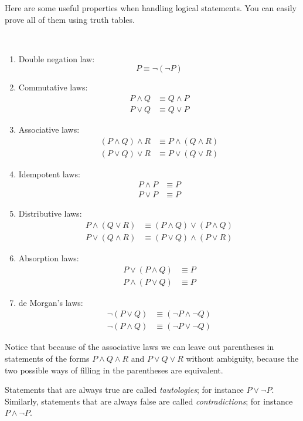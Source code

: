 Here are some useful properties when handling logical statements. You can easily prove all of them using truth tables.
\begin{lemma} \
\begin{enumerate}[label=(\roman*)]
\item Double negation law:
\[P\equiv\lnot(\lnot P)\]
\item Commutative laws:
\begin{align*}
P\land Q&\equiv Q\land P\\
P\lor Q&\equiv Q\lor P
\end{align*}
\item Associative laws:
\begin{align*}
(P\land Q)\land R&\equiv P\land (Q\land R)\\
(P\lor Q)\lor R&\equiv P\lor (Q\lor R)
\end{align*}
\item Idempotent laws:
\begin{align*}
P\land P&\equiv P\\
P\lor P&\equiv P
\end{align*}
\item Distributive laws:
\begin{align*}
P\land(Q\lor R)&\equiv (P\land Q)\lor(P\land Q)\\
P\lor(Q\land R)&\equiv (P\lor Q)\land(P\lor R)
\end{align*}
\item Absorption laws:
\begin{align*}
P\lor(P\land Q)&\equiv P\\
P\land(P\lor Q)&\equiv P
\end{align*}
\item de Morgan's laws:
\begin{align*}
\lnot(P\lor Q)&\equiv(\lnot P\land\lnot Q)\\
\lnot(P\land Q)&\equiv(\lnot P\lor\lnot Q)
\end{align*}
\end{enumerate}
\end{lemma}

\begin{remark}
Notice that because of the associative laws we can leave out parentheses in statements of the forms $P\land Q\land R$ and $P\lor Q\lor R$ without ambiguity, because the two possible ways of filling in the parentheses are equivalent.
\end{remark}

Statements that are always true are called \emph{tautologies}; for instance $P\lor\lnot P$. Similarly, statements that are always false are called \emph{contradictions}; for instance $P\land\lnot P$.


